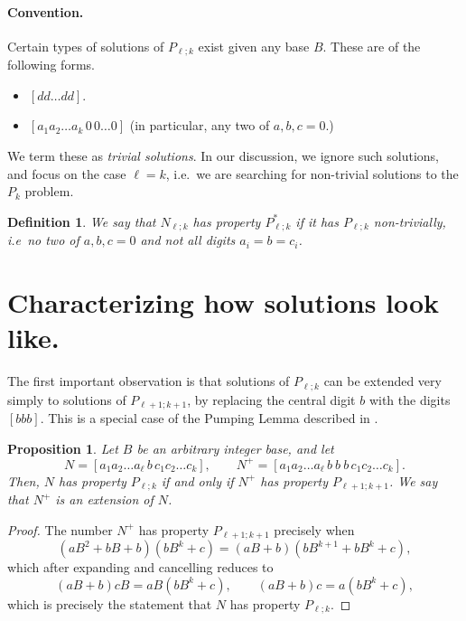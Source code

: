 \documentclass[sn-mathphys]{sn-jnl}%
\theoremstyle{thmstyleone}%
\newtheorem{proposition}[theorem]{Proposition}%
\theoremstyle{thmstyletwo}%
\theoremstyle{thmstylethree}%
\newtheorem{definition}{Definition}%
\begin{document}
\paragraph{Convention.}
Certain types of solutions of $P_{\ell; k}$ exist given any base
$B$. These are of the following forms. \begin{itemize}
    \item $[dd\dots dd]$.
    \item $[a_1a_2\dots a_k\,0\,0\dots 0]$ (in particular, any two of $a, b, c = 0$.)
\end{itemize}
We term these as \emph{trivial solutions}.
In our discussion, we ignore such solutions, and focus on the case $\ell = k$,
i.e.\ we are searching for non-trivial solutions to the $P_k$ problem.

\begin{definition}
    We say that $N_{\ell; k}$ has property $P^*_{\ell; k}$ if it has $P_{\ell; k}$
    non-trivially, i.e\ no two of $a, b, c = 0$ and not all digits $a_i = b = c_i$.
\end{definition}


\section{Characterizing how solutions look like.} \label{section:patterns}

The first important observation is that solutions of $P_{\ell; k}$ can be
extended very simply to solutions of $P_{\ell + 1; k + 1}$, by replacing
the central digit $b$ with the digits $[b b b]$. This is a special case
of the Pumping Lemma described in \cite{gold}.

\begin{proposition} \label{proposition:extension}
    Let $B$ be an arbitrary integer base, and let \[
        N = [a_1a_2\dots a_\ell \,b\, c_1c_2\dots c_k], \qquad
        N^+ = [a_1a_2\dots a_\ell \,b\: b\: b\, c_1c_2\dots c_k].
    \] Then, $N$ has property $P_{\ell; k}$ if and only if $N^+$ has property
    $P_{\ell + 1; k + 1}$. We say that $N^+$ is an \emph{extension} of $N$.
\end{proposition}
\begin{proof}
    The number $N^+$ has property $P_{\ell + 1; k + 1}$ precisely when \[
        (aB^2 + bB + b)(bB^k + c) = (aB + b)(bB^{k + 1} + bB^k + c),
    \] which after expanding and cancelling reduces to \[
        (aB + b)cB = aB(bB^k + c), \qquad (aB + b)c = a(bB^k + c),
    \] which is precisely the statement that $N$ has property $P_{\ell; k}$.
\end{proof}
\end{document}
